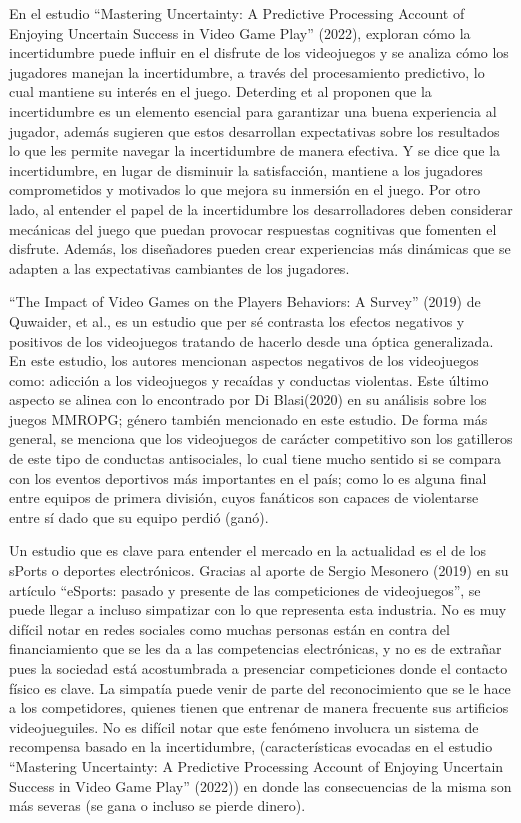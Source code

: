 \documentclass[
  letterpaper,
  DIV=11,
  numbers=noendperiod]{scrreprt}
\begin{document}
En el estudio ``Mastering Uncertainty: A Predictive Processing Account
of Enjoying Uncertain Success in Video Game Play'' (2022), exploran cómo
la incertidumbre puede influir en el disfrute de los videojuegos y se
analiza cómo los jugadores manejan la incertidumbre, a través del
procesamiento predictivo, lo cual mantiene su interés en el juego.
Deterding et al proponen que la incertidumbre es un elemento esencial
para garantizar una buena experiencia al jugador, además sugieren que
estos desarrollan expectativas sobre los resultados lo que les permite
navegar la incertidumbre de manera efectiva. Y se dice que la
incertidumbre, en lugar de disminuir la satisfacción, mantiene a los
jugadores comprometidos y motivados lo que mejora su inmersión en el
juego. Por otro lado, al entender el papel de la incertidumbre los
desarrolladores deben considerar mecánicas del juego que puedan provocar
respuestas cognitivas que fomenten el disfrute. Además, los diseñadores
pueden crear experiencias más dinámicas que se adapten a las
expectativas cambiantes de los jugadores.

``The Impact of Video Games on the Players Behaviors: A Survey'' (2019)
de Quwaider, et al., es un estudio que per sé contrasta los efectos
negativos y positivos de los videojuegos tratando de hacerlo desde una
óptica generalizada. En este estudio, los autores mencionan aspectos
negativos de los videojuegos como: adicción a los videojuegos y recaídas
y conductas violentas. Este último aspecto se alinea con lo encontrado
por Di Blasi(2020) en su análisis sobre los juegos MMROPG; género
también mencionado en este estudio. De forma más general, se menciona
que los videojuegos de carácter competitivo son los gatilleros de este
tipo de conductas antisociales, lo cual tiene mucho sentido si se
compara con los eventos deportivos más importantes en el país; como lo
es alguna final entre equipos de primera división, cuyos fanáticos son
capaces de violentarse entre sí dado que su equipo perdió (ganó).

Un estudio que es clave para entender el mercado en la actualidad es el
de los sPorts o deportes electrónicos. Gracias al aporte de Sergio
Mesonero (2019) en su artículo ``eSports: pasado y presente de las
competiciones de videojuegos'', se puede llegar a incluso simpatizar con
lo que representa esta industria. No es muy difícil notar en redes
sociales como muchas personas están en contra del financiamiento que se
les da a las competencias electrónicas, y no es de extrañar pues la
sociedad está acostumbrada a presenciar competiciones donde el contacto
físico es clave. La simpatía puede venir de parte del reconocimiento que
se le hace a los competidores, quienes tienen que entrenar de manera
frecuente sus artificios videojueguiles. No es difícil notar que este
fenómeno involucra un sistema de recompensa basado en la incertidumbre,
(características evocadas en el estudio ``Mastering Uncertainty: A
Predictive Processing Account of Enjoying Uncertain Success in Video
Game Play'' (2022)) en donde las consecuencias de la misma son más
severas (se gana o incluso se pierde dinero).
\end{document}
